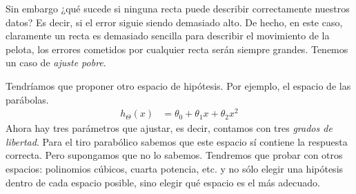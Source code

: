 Sin embargo ¿qué sucede si ninguna recta puede describir correctamente nuestros datos? Es decir, si el error siguie siendo demasiado alto.  De hecho, en este caso, claramente un recta es demasiado sencilla para describir el movimiento de la pelota, los errores cometidos por cualquier recta serán siempre grandes.  Tenemos un caso de \emph{ajuste pobre}.

Tendríamos que proponer otro espacio de hipótesis.  Por ejemplo, el espacio de las parábolas.
\begin{align*}
 h_{\Theta}(x) &= \theta_0 + \theta_1 x + \theta_2 x^2
\end{align*}
Ahora hay tres parámetros que ajustar, es decir, contamos con tres \emph{grados de libertad}.  Para el tiro parabólico sabemos que este espacio sí contiene la respuesta correcta.  Pero supongamos que no lo sabemos.  Tendremos que probar con otros espacios: polinomios cúbicos, cuarta potencia, etc. y no sólo elegir una hipótesis dentro de cada espacio posible, sino elegir qué espacio es el más adecuado.

